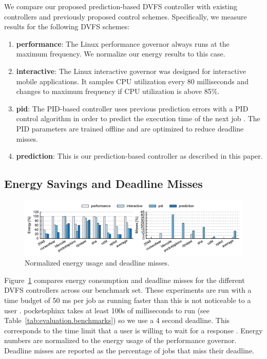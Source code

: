We compare our proposed prediction-based DVFS controller with existing
controllers and previously proposed control schemes. Specifically, we measure
results for the following DVFS schemes:
\begin{enumerate}
  \item \textbf{performance}: The Linux performance governor
  \cite{linux_governors} always runs at the maximum frequency. We normalize our
  energy results to this case.
  \item \textbf{interactive}: The Linux interactive governor
  \cite{linux_governors} was designed for interactive mobile applications. It
  samples CPU utilization every 80 milliseconds and changes to maximum
  frequency if CPU utilization is above 85\%.
  \item \textbf{pid}: The PID-based controller uses previous prediction errors
  with a PID control algorithm in order to predict the execution time of the next
  job \cite{gu-dac08}. The PID parameters are trained offline and are optimized
  to reduce deadline misses.
  \item \textbf{prediction}: This is our prediction-based controller as
  described in this paper.
\end{enumerate}

\subsection{Energy Savings and Deadline Misses}

\begin{figure}
  \begin{center}
    \includegraphics{exec_time_prediction/data/em_summary.pdf}
    \caption{Normalized energy usage and deadline misses.}
    \label{fig:evaluation.em_summary}
  \end{center}
\end{figure}

Figure~\ref{fig:evaluation.em_summary} compares energy consumption and deadline
misses for the different DVFS controllers across our benchmark set. These
experiments are run with a time budget of 50 ms per job as running faster than
this is not noticeable to a user \cite{lindgaard-bit06, eqos-hpca15}.
pocketsphinx takes at least 100s of milliseconds to run (see
Table~\ref{tab:evaluation.benchmarks}) so we use a 4 second deadline. This
corresponds to the time limit that a user is willing to wait for a response
\cite{miller-afips68}.  Energy
numbers are normalized to the energy usage of the performance governor.
Deadline misses are reported as the percentage of jobs that miss their
deadline. 


